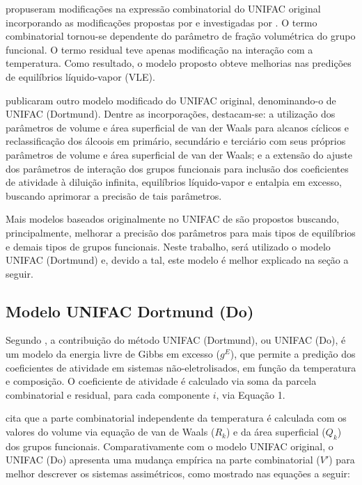  propuseram modificações na expressão 
combinatorial do
UNIFAC original incorporando as modificações propostas por 
 e investigadas por . 
O termo combinatorial tornou-se dependente do parâmetro de 
fração volumétrica do grupo funcional. O termo residual teve 
apenas modificação na interação com a temperatura. Como 
resultado, o modelo proposto obteve melhorias nas predições 
de equilíbrios líquido-vapor (VLE).

 publicaram outro modelo modificado do
UNIFAC original, denominando-o de UNIFAC (Dortmund). Dentre as 
incorporações, destacam-se: a utilização dos parâmetros de 
volume e área superficial de van der Waals para alcanos 
cíclicos e reclassificação dos álcoois em primário, 
secundário e terciário com seus próprios parâmetros de 
volume e área superficial de van der Waals; e a extensão 
do ajuste dos parâmetros de interação dos grupos funcionais 
para inclusão dos coeficientes de atividade à diluição 
infinita, equilíbrios líquido-vapor e entalpia em excesso, 
buscando aprimorar a precisão de tais parâmetros.

Mais modelos baseados originalmente no UNIFAC de  são
propostos buscando, principalmente, melhorar a precisão dos 
parâmetros para mais tipos de equilíbrios e demais tipos de 
grupos funcionais. Neste trabalho, será utilizado o modelo 
UNIFAC (Dortmund) e, devido a tal, este modelo é melhor 
explicado na seção a seguir.

\subsection{Modelo UNIFAC Dortmund (Do)}

Segundo , a contribuição do método 
UNIFAC (Dortmund), ou
UNIFAC (Do), é um modelo da energia livre de Gibbs em 
excesso ($g^E$), que permite a predição dos coeficientes de atividade em
sistemas não-eletrolisados, em função da temperatura e 
composição. O coeficiente de atividade é calculado via 
soma da parcela combinatorial e residual, para cada 
componente $i$, via Equação 1.

 cita que a parte combinatorial 
independente da temperatura é
calculada com os valores do volume via equação de van 
de Waals ($R_k$) e da área superficial ($Q_k$) dos grupos funcionais. 
Comparativamente com o modelo UNIFAC original, o UNIFAC (Do)
 apresenta uma mudança empírica na parte combinatorial ($V'$) 
para melhor descrever os sistemas assimétricos, como 
mostrado nas equações a seguir:

